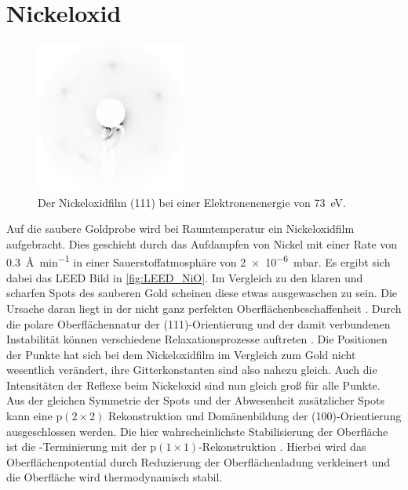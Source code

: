     \section{Nickeloxid}    
        \begin{figure}
            \centering
            \includegraphics[height=5cm]{./content/pictures/NiO/2021_06_15_019_NiO(111)_73eV_Thicklayer}
            \caption{Der Nickeloxidfilm (111) bei einer Elektronenenergie von \SI{73}{\electronvolt}.}
            \label{fig:LEED_NiO}
        \end{figure}
        Auf die saubere Goldprobe wird bei Raumtemperatur ein Nickeloxidfilm aufgebracht.
        Dies geschieht durch das Aufdampfen von Nickel mit einer Rate von \SI{0.3}{\angstrom\per\minute} in einer Sauerstoffatmosphäre von \SI{2e-6}{\milli\bar}.
        Es ergibt sich dabei das LEED Bild in \autoref{fig:LEED_NiO}.
        Im Vergleich zu den klaren und scharfen Spots des sauberen Gold scheinen diese etwas ausgewaschen zu sein.
        Die Ursache daran liegt in der nicht ganz perfekten Oberflächenbeschaffenheit \cite{NiO_34}.
        Durch die polare Oberflächennatur der (111)-Orientierung und der damit verbundenen Instabilität können verschiedene Relaxationsprozesse auftreten \cite{NiO_36, NiO_35, NiO_34, NiO_27, NiO_10}.
        Die Positionen der Punkte hat sich bei dem Nickeloxidfilm im Vergleich zum Gold nicht wesentlich verändert, ihre Gitterkonstanten sind also nahezu gleich.
        Auch die Intensitäten der Reflexe beim Nickeloxid sind nun gleich groß für alle Punkte.
        Aus der gleichen Symmetrie der Spots und der Abwesenheit zusätzlicher Spots kann eine $\text{p}(2 \times 2)$ Rekonstruktion \cite{NiO_37} und Domänenbildung der (100)-Orientierung \cite{NiO_36} ausgeschlossen werden.
        Die hier wahrscheinlichste Stabilisierung der Oberfläche ist die -Terminierung mit der $\text{p}(1 \times 1)$-Rekonstruktion \cite{NiO_35}.
        Hierbei wird das Oberflächenpotential durch Reduzierung der Oberflächenladung verkleinert und die Oberfläche wird thermodynamisch stabil.

